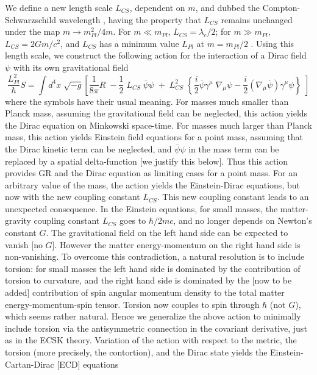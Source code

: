 \documentclass[prd, preprint, 12pt]{revtex4-1}
\begin{document}
We define a new length scale $L_{CS}$, dependent on $m$, and dubbed the Compton-Schwarzschild wavelength \cite{Carr}, having the property that $L_{CS}$ remains unchanged under the map $m\rightarrow m_{Pl}^2/4m$. For $m\ll m_{Pl}$, \; $L_{CS}=\lambda_c/2$; for $m\gg m_{Pl}$, \; $L_{CS}=2Gm/c^2$, and $L_{CS}$ has a minimum value $L_{Pl}$ at $m= m_{Pl}/2$ \cite{Singh1}. Using this length scale, we construct the following action for the interaction of a Dirac field $\psi$ with its own gravitational field \cite{Singh2}
\begin{equation}
\frac{L_{Pl}^2 }{\hbar} S =  \int d^4x \;\sqrt{-g} \left[ \frac{1}{8\pi} R\;  - \frac{1}{2}\; L_{CS}\; {\overline\psi}{\psi} \; + \; L_{CS}^2 \; \left\{\frac{i}{2}{\overline\psi}\gamma^{\mu}\; \nabla_\mu\psi  - \frac{i}{2} (\nabla_{\mu}\overline\psi)\gamma^{\mu}\psi\right\}
\; \right] 
\label{actualaction3}
\end{equation}
where the symbols have their usual meaning. For masses much smaller than Planck mass, assuming the gravitational field can be neglected, this action yields the Dirac equation on Minkowski space-time. For masses much larger than Planck mass, this action yields Einstein field equations for a point mass, assuming that the Dirac kinetic term can be neglected, and $\overline{\psi}\psi$ in the mass term can be replaced by a spatial delta-function [we justify this below]. Thus this action provides GR and the Dirac equation as limiting cases for a point mass. For an arbitrary value of the mass, the action yields the Einstein-Dirac equations, but now with the new coupling constant $L_{CS}$. This new coupling constant leads to an unexpected consequence. In the Einstein equations, for small masses, the  matter-gravity coupling constant $L_{CS}$ goes to $\hbar/2mc$, and no longer depends on Newton's constant $G$. The gravitational field on the left hand side can be expected to vanish [no $G$]. However the matter energy-momentum on the right hand side is non-vanishing. To overcome this contradiction, a natural resolution is to include torsion: for small masses the left hand side is dominated by the contribution of torsion to curvature, and the right hand side is dominated by the [now to be added] contribution of spin angular momentum density to the total matter energy-momentum-spin tensor. Torsion now couples to spin through $\hbar$ (not $G$), which seems rather natural.
Hence we generalize the above action to minimally include torsion via the antisymmetric connection in the covariant derivative, just as in the ECSK theory. Variation of the action with respect to the metric, the torsion (more precisely, the contortion), and the Dirac state yields the Einstein-Cartan-Dirac [ECD] equations
\end{document}
